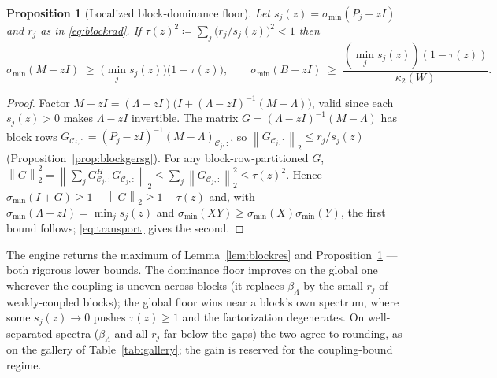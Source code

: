 \documentclass[11pt,a4paper]{article}
\newcommand{\norm}[1]{\left\|#1\right\|}
\theoremstyle{plain}
\newtheorem{proposition}[theorem]{Proposition}
\theoremstyle{definition}
\begin{document}
\begin{proposition}[Localized block-dominance floor]\label{prop:blockdom}
Let $s_j(z)=\sigma_{\min}(P_j-zI)$ and $r_j$ as in \eqref{eq:blockrad}. If
$\tau(z)^2\coloneqq\sum_j\big(r_j/s_j(z)\big)^2<1$ then
\[
  \sigma_{\min}(M-zI)\;\ge\;\Big(\min_j s_j(z)\Big)\big(1-\tau(z)\big),
  \qquad
  \sigma_{\min}(B-zI)\;\ge\;\frac{(\min_j s_j(z))(1-\tau(z))}{\kappa_2(W)} .
\]
\end{proposition}

\begin{proof}
Factor $M-zI=(\Lambda-zI)\big(I+(\Lambda-zI)^{-1}(M-\Lambda)\big)$, valid since each
$s_j(z)>0$ makes $\Lambda-zI$ invertible. The matrix $G=(\Lambda-zI)^{-1}(M-\Lambda)$ has
block rows $G_{\mathcal C_j,:}=(P_j-zI)^{-1}(M-\Lambda)_{\mathcal C_j,:}$, so
$\norm{G_{\mathcal C_j,:}}_2\le r_j/s_j(z)$ (Proposition~\ref{prop:blockgersg}). For any
block-row-partitioned $G$, $\norm{G}_2^2=\norm{\sum_j G_{\mathcal C_j,:}^H G_{\mathcal C_j,:}}_2
\le\sum_j\norm{G_{\mathcal C_j,:}}_2^2\le\tau(z)^2$. Hence
$\sigma_{\min}(I+G)\ge1-\norm{G}_2\ge1-\tau(z)$ and, with
$\sigma_{\min}(\Lambda-zI)=\min_j s_j(z)$ and $\sigma_{\min}(XY)\ge\sigma_{\min}(X)\sigma_{\min}(Y)$,
the first bound follows; \eqref{eq:transport} gives the second.
\end{proof}

The engine returns the maximum of Lemma~\ref{lem:blockres} and
Proposition~\ref{prop:blockdom} --- both rigorous lower bounds. The dominance floor improves
on the global one wherever the coupling is uneven across blocks (it replaces $\beta_\Lambda$
by the small $r_j$ of weakly-coupled blocks); the global floor wins near a block's own
spectrum, where some $s_j(z)\to0$ pushes $\tau(z)\ge1$ and the factorization degenerates.
On well-separated spectra ($\beta_\Lambda$ and all $r_j$ far below the gaps) the two agree to
rounding, as on the gallery of Table~\ref{tab:gallery}; the gain is reserved for the
coupling-bound regime.
\end{document}
